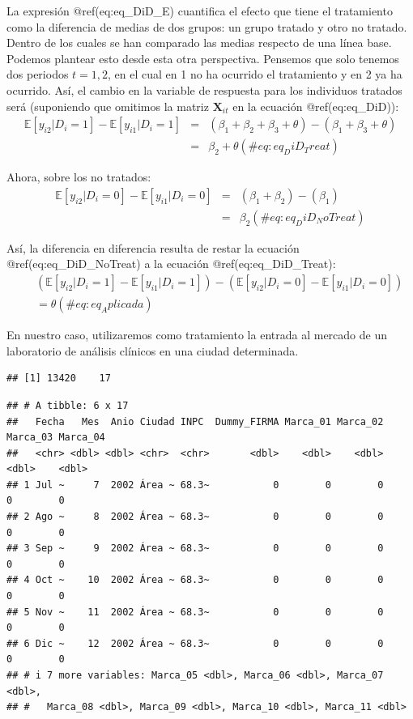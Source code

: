 \documentclass[
]{book}
\begin{document}
La expresión @ref(eq:eq\_DiD\_E) cuantifica el efecto que tiene el tratamiento como la diferencia de medias de dos grupos: un grupo tratado y otro no tratado. Dentro de los cuales se han comparado las medias respecto de una línea base. Podemos plantear esto desde esta otra perspectiva. Pensemos que solo tenemos dos periodos \(t = {1, 2}\), en el cual en 1 no ha ocurrido el tratamiento y en 2 ya ha ocurrido. Así, el cambio en la variable de respuesta para los individuos tratados será (suponiendo que omitimos la matriz \(\mathbf{X}_{it}\) en la ecuación @ref(eq:eq\_DiD)):
\begin{eqnarray}
    \mathbb{E}[ y_{i2} | D_i = 1 ] - \mathbb{E}[ y_{i1} | D_i = 1 ] & = & ( \beta_1 + \beta_2 + \beta_3 + \theta ) - ( \beta_1 + \beta_3 + \theta ) \nonumber \\  
    & = & \beta_2 + \theta 
    (\#eq:eq_DiD_Treat)
\end{eqnarray}

Ahora, sobre los no tratados:
\begin{eqnarray}
    \mathbb{E}[ y_{i2} | D_i = 0 ] - \mathbb{E}[ y_{i1} | D_i = 0 ] & = & ( \beta_1 + \beta_2 ) - ( \beta_1 ) \nonumber \\  
    & = & \beta_2 
    (\#eq:eq_DiD_NoTreat)
\end{eqnarray}

Así, la diferencia en diferencia resulta de restar la ecuación @ref(eq:eq\_DiD\_NoTreat) a la ecuación @ref(eq:eq\_DiD\_Treat):
\begin{eqnarray}
    & & ( \mathbb{E}[ y_{i2} | D_i = 1 ] - \mathbb{E}[ y_{i1} | D_i = 1 ] ) - ( \mathbb{E}[ y_{i2} | D_i = 0 ] - \mathbb{E}[ y_{i1} | D_i = 0 ] ) \nonumber \\ 
    & & = \theta 
    (\#eq:eq_Aplicada)
\end{eqnarray}

En nuestro caso, utilizaremos como tratamiento la entrada al mercado de un laboratorio de análisis clínicos en una ciudad determinada.

\begin{verbatim}
## [1] 13420    17
\end{verbatim}

\begin{verbatim}
## # A tibble: 6 x 17
##   Fecha   Mes  Anio Ciudad INPC  Dummy_FIRMA Marca_01 Marca_02 Marca_03 Marca_04
##   <chr> <dbl> <dbl> <chr>  <chr>       <dbl>    <dbl>    <dbl>    <dbl>    <dbl>
## 1 Jul ~     7  2002 Área ~ 68.3~           0        0        0        0        0
## 2 Ago ~     8  2002 Área ~ 68.3~           0        0        0        0        0
## 3 Sep ~     9  2002 Área ~ 68.3~           0        0        0        0        0
## 4 Oct ~    10  2002 Área ~ 68.3~           0        0        0        0        0
## 5 Nov ~    11  2002 Área ~ 68.3~           0        0        0        0        0
## 6 Dic ~    12  2002 Área ~ 68.3~           0        0        0        0        0
## # i 7 more variables: Marca_05 <dbl>, Marca_06 <dbl>, Marca_07 <dbl>,
## #   Marca_08 <dbl>, Marca_09 <dbl>, Marca_10 <dbl>, Marca_11 <dbl>
\end{verbatim}
\end{document}

